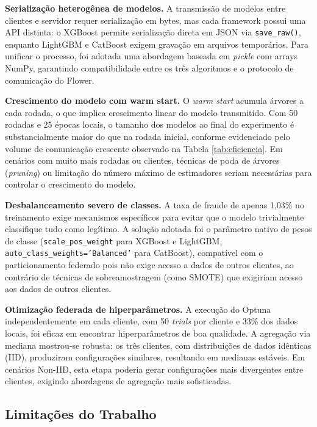 \textbf{Serialização heterogênea de modelos.} A transmissão de modelos entre clientes e servidor requer serialização em bytes, mas cada framework possui uma API distinta: o XGBoost permite serialização direta em JSON via \texttt{save\_raw()}, enquanto LightGBM e CatBoost exigem gravação em arquivos temporários. Para unificar o processo, foi adotada uma abordagem baseada em \textit{pickle} com arrays NumPy, garantindo compatibilidade entre os três algoritmos e o protocolo de comunicação do Flower.

\textbf{Crescimento do modelo com warm start.} O \textit{warm start} acumula árvores a cada rodada, o que implica crescimento linear do modelo transmitido. Com 50 rodadas e 25 épocas locais, o tamanho dos modelos ao final do experimento é substancialmente maior do que na rodada inicial, conforme evidenciado pelo volume de comunicação crescente observado na Tabela \ref{tab:eficiencia}. Em cenários com muito mais rodadas ou clientes, técnicas de poda de árvores (\textit{pruning}) ou limitação do número máximo de estimadores seriam necessárias para controlar o crescimento do modelo.

\textbf{Desbalanceamento severo de classes.} A taxa de fraude de apenas 1,03\% no treinamento exige mecanismos específicos para evitar que o modelo trivialmente classifique tudo como legítimo. A solução adotada foi o parâmetro nativo de pesos de classe (\texttt{scale\_pos\_weight} para XGBoost e LightGBM, \texttt{auto\_class\_weights='Balanced'} para CatBoost), compatível com o particionamento federado pois não exige acesso a dados de outros clientes, ao contrário de técnicas de sobreamostragem (como SMOTE) que exigiriam acesso aos dados de outros clientes.

\textbf{Otimização federada de hiperparâmetros.} A execução do Optuna independentemente em cada cliente, com 50 \textit{trials} por cliente e 33\% dos dados locais, foi eficaz em encontrar hiperparâmetros de boa qualidade. A agregação via mediana mostrou-se robusta: os três clientes, com distribuições de dados idênticas (IID), produziram configurações similares, resultando em medianas estáveis. Em cenários Non-IID, esta etapa poderia gerar configurações mais divergentes entre clientes, exigindo abordagens de agregação mais sofisticadas.

\subsection{Limitações do Trabalho}

